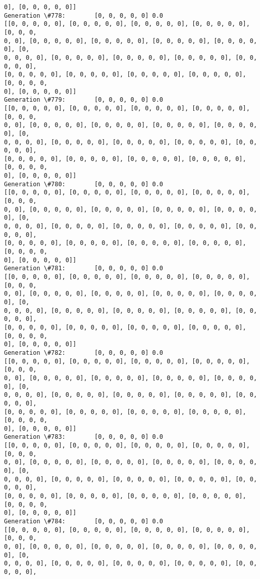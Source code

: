 \documentclass[11pt]{article}
\begin{document}
\begin{Verbatim}[commandchars=\\\{\}]
0], [0, 0, 0, 0, 0]]
Generation \#778:        [0, 0, 0, 0, 0] 0.0
[[0, 0, 0, 0, 0], [0, 0, 0, 0, 0], [0, 0, 0, 0, 0], [0, 0, 0, 0, 0], [0, 0, 0,
0, 0], [0, 0, 0, 0, 0], [0, 0, 0, 0, 0], [0, 0, 0, 0, 0], [0, 0, 0, 0, 0], [0,
0, 0, 0, 0], [0, 0, 0, 0, 0], [0, 0, 0, 0, 0], [0, 0, 0, 0, 0], [0, 0, 0, 0, 0],
[0, 0, 0, 0, 0], [0, 0, 0, 0, 0], [0, 0, 0, 0, 0], [0, 0, 0, 0, 0], [0, 0, 0, 0,
0], [0, 0, 0, 0, 0]]
Generation \#779:        [0, 0, 0, 0, 0] 0.0
[[0, 0, 0, 0, 0], [0, 0, 0, 0, 0], [0, 0, 0, 0, 0], [0, 0, 0, 0, 0], [0, 0, 0,
0, 0], [0, 0, 0, 0, 0], [0, 0, 0, 0, 0], [0, 0, 0, 0, 0], [0, 0, 0, 0, 0], [0,
0, 0, 0, 0], [0, 0, 0, 0, 0], [0, 0, 0, 0, 0], [0, 0, 0, 0, 0], [0, 0, 0, 0, 0],
[0, 0, 0, 0, 0], [0, 0, 0, 0, 0], [0, 0, 0, 0, 0], [0, 0, 0, 0, 0], [0, 0, 0, 0,
0], [0, 0, 0, 0, 0]]
Generation \#780:        [0, 0, 0, 0, 0] 0.0
[[0, 0, 0, 0, 0], [0, 0, 0, 0, 0], [0, 0, 0, 0, 0], [0, 0, 0, 0, 0], [0, 0, 0,
0, 0], [0, 0, 0, 0, 0], [0, 0, 0, 0, 0], [0, 0, 0, 0, 0], [0, 0, 0, 0, 0], [0,
0, 0, 0, 0], [0, 0, 0, 0, 0], [0, 0, 0, 0, 0], [0, 0, 0, 0, 0], [0, 0, 0, 0, 0],
[0, 0, 0, 0, 0], [0, 0, 0, 0, 0], [0, 0, 0, 0, 0], [0, 0, 0, 0, 0], [0, 0, 0, 0,
0], [0, 0, 0, 0, 0]]
Generation \#781:        [0, 0, 0, 0, 0] 0.0
[[0, 0, 0, 0, 0], [0, 0, 0, 0, 0], [0, 0, 0, 0, 0], [0, 0, 0, 0, 0], [0, 0, 0,
0, 0], [0, 0, 0, 0, 0], [0, 0, 0, 0, 0], [0, 0, 0, 0, 0], [0, 0, 0, 0, 0], [0,
0, 0, 0, 0], [0, 0, 0, 0, 0], [0, 0, 0, 0, 0], [0, 0, 0, 0, 0], [0, 0, 0, 0, 0],
[0, 0, 0, 0, 0], [0, 0, 0, 0, 0], [0, 0, 0, 0, 0], [0, 0, 0, 0, 0], [0, 0, 0, 0,
0], [0, 0, 0, 0, 0]]
Generation \#782:        [0, 0, 0, 0, 0] 0.0
[[0, 0, 0, 0, 0], [0, 0, 0, 0, 0], [0, 0, 0, 0, 0], [0, 0, 0, 0, 0], [0, 0, 0,
0, 0], [0, 0, 0, 0, 0], [0, 0, 0, 0, 0], [0, 0, 0, 0, 0], [0, 0, 0, 0, 0], [0,
0, 0, 0, 0], [0, 0, 0, 0, 0], [0, 0, 0, 0, 0], [0, 0, 0, 0, 0], [0, 0, 0, 0, 0],
[0, 0, 0, 0, 0], [0, 0, 0, 0, 0], [0, 0, 0, 0, 0], [0, 0, 0, 0, 0], [0, 0, 0, 0,
0], [0, 0, 0, 0, 0]]
Generation \#783:        [0, 0, 0, 0, 0] 0.0
[[0, 0, 0, 0, 0], [0, 0, 0, 0, 0], [0, 0, 0, 0, 0], [0, 0, 0, 0, 0], [0, 0, 0,
0, 0], [0, 0, 0, 0, 0], [0, 0, 0, 0, 0], [0, 0, 0, 0, 0], [0, 0, 0, 0, 0], [0,
0, 0, 0, 0], [0, 0, 0, 0, 0], [0, 0, 0, 0, 0], [0, 0, 0, 0, 0], [0, 0, 0, 0, 0],
[0, 0, 0, 0, 0], [0, 0, 0, 0, 0], [0, 0, 0, 0, 0], [0, 0, 0, 0, 0], [0, 0, 0, 0,
0], [0, 0, 0, 0, 0]]
Generation \#784:        [0, 0, 0, 0, 0] 0.0
[[0, 0, 0, 0, 0], [0, 0, 0, 0, 0], [0, 0, 0, 0, 0], [0, 0, 0, 0, 0], [0, 0, 0,
0, 0], [0, 0, 0, 0, 0], [0, 0, 0, 0, 0], [0, 0, 0, 0, 0], [0, 0, 0, 0, 0], [0,
0, 0, 0, 0], [0, 0, 0, 0, 0], [0, 0, 0, 0, 0], [0, 0, 0, 0, 0], [0, 0, 0, 0, 0],

\end{Verbatim}
\end{document}
